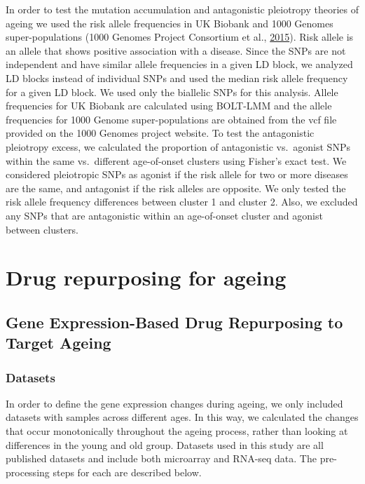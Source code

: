 \documentclass[12pt,twoside]{unicam}
\begin{document}
In order to test the mutation accumulation and antagonistic pleiotropy theories of ageing we used the risk allele frequencies in UK Biobank and 1000 Genomes super-populations (1000 Genomes Project Consortium et al., \protect\hyperlink{ref-1000_Genomes_Project_Consortium2015}{2015}). Risk allele is an allele that shows positive association with a disease. Since the SNPs are not independent and have similar allele frequencies in a given LD block, we analyzed LD blocks instead of individual SNPs and used the median risk allele frequency for a given LD block. We used only the biallelic SNPs for this analysis. Allele frequencies for UK Biobank are calculated using BOLT-LMM and the allele frequencies for 1000 Genome super-populations are obtained from the vcf file provided on the 1000 Genomes project website. To test the antagonistic pleiotropy excess, we calculated the proportion of antagonistic vs.~agonist SNPs within the same vs.~different age-of-onset clusters using Fisher's exact test. We considered pleiotropic SNPs as agonist if the risk allele for two or more diseases are the same, and antagonist if the risk alleles are opposite. We only tested the risk allele frequency differences between cluster 1 and cluster 2. Also, we excluded any SNPs that are antagonistic within an age-of-onset cluster and agonist between clusters.

\hypertarget{drug-repurposing-for-ageing-1}{%
\section{Drug repurposing for ageing}\label{drug-repurposing-for-ageing-1}}

\hypertarget{gene-expression-based-drug-repurposing-to-target-ageing}{%
\subsection{Gene Expression-Based Drug Repurposing to Target Ageing}\label{gene-expression-based-drug-repurposing-to-target-ageing}}

\hypertarget{datasets}{%
\subsubsection{Datasets}\label{datasets}}

In order to define the gene expression changes during ageing, we only included datasets with samples across different ages. In this way, we calculated the changes that occur monotonically throughout the ageing process, rather than looking at differences in the young and old group. Datasets used in this study are all published datasets and include both microarray and RNA-seq data. The pre-processing steps for each are described below.
\end{document}

